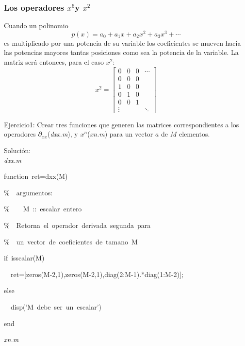 \subsubsection{Los operadores $x^{6}$y $x^{2}$}

Cuando un polinomio\[
p(x)=a_{0}+a_{1}x+a_{2}x^{2}+a_{3}x^{3}+\cdots\]
es multiplicado por una potencia de su variable los coeficientes se
mueven hacia las potencias mayores tantas posiciones como sea la potencia
de la variable. La matriz será entonces, para el caso $x^{2}$:\[
x^{2}=\left[\begin{array}{cccc}
0 & 0 & 0 & \cdots\\
0 & 0 & 0\\
1 & 0 & 0\\
0 & 1 & 0\\
0 & 0 & 1\\
\vdots &  &  & \ddots\end{array}\right]\]


\lyxline{\normalsize}

Ejercicio1: Crear tres funciones que generen las matrices correspondientes
a los operadores $\partial_{xx}$(\emph{dxx.m}), y $x^{n}$(\emph{xn.m})
para un vector $a$ de $M$ elementos.

%
%


Solución:\emph{}\\
\emph{dxx.m}

\begin{lyxcode}
function~ret=dxx(M)



\%~~argumentos:

\%~~~~M~::~escalar~entero

\%~~Retorna~el~operador~derivada~segunda~para

\%~~un~vector~de~coeficientes~de~tamano~M



if~isscalar(M)

~~ret={[}zeros(M-2,1),zeros(M-2,1),diag(2:M-1).{*}diag(1:M-2)];

else

~~disp('M~debe~ser~un~escalar')

end
\end{lyxcode}
\emph{xn.m}

